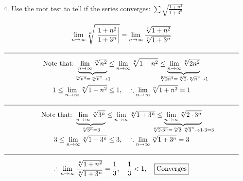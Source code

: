 \begin{itemize}
        \item [4.] Use the root test to tell if the series converges: $\sum\sqrt{\frac{1+n^{2}}{1+3^{n}}}$
        \\
        \begin{mdframed}
            \begin{equation*}
                \begin{gathered}
                    \lim_{n \to \infty}
                    \sqrt[n]
                    {\left|
                        \frac{1+n^{2}}{1+3^{n}}
                    \right|}
                    = \lim_{n \to \infty}
                    \frac{\sqrt[n]{1+n^{2}}}{\sqrt[n]{1+3^{n}}}                 \\
                    \horizontal                                                 \\
                    \text{Note that: } 
                    \underbrace{\lim_{n \to \infty}\sqrt[n]{n^{2}}}
                    _{\mathclap{\sqrt[n]{n^{2}} = \sqrt[n]{n}^{2} \to 1}} \leq
                    \lim_{n \to \infty}\sqrt[n]{1+n^{2}} \leq
                    \underbrace{\lim_{n \to \infty}\sqrt[n]{2n^{2}}}
                    _{\mathclap{\sqrt[n]{2n^{2}} = 
                    \sqrt[n]{2}\cdot\sqrt[n]{n}^{2} \to 1}}  \\
                    1 \leq \lim_{n \to \infty}\sqrt[n]{1+n^{2}} \leq 1, \quad 
                    \therefore \lim_{n \to \infty}\sqrt[n]{1+n^{2}} = 1         \\
                    \horizontal                                                 \\
                    \text{Note that: } 
                    \underbrace{\lim_{n \to \infty}\sqrt[n]{3^{n}}}
                    _{\mathclap{\sqrt[n]{3^{n}} = 3}} \leq
                    \lim_{n \to \infty}\sqrt[n]{1+3^{n}} \leq
                    \underbrace{\lim_{n \to \infty}\sqrt[n]{2\cdot3^{n}}}
                    _{\mathclap{\sqrt[n]{2\cdot3^{n}} = 
                    \sqrt[n]{2}\cdot\sqrt[n]{3}^{n} \to 1\cdot3 = 3}}           \\
                    3 \leq \lim_{n \to \infty}\sqrt[n]{1+3^{n}} \leq 3, \quad 
                    \therefore \lim_{n \to \infty}\sqrt[n]{1+3^{n}} = 3         \\
                    \horizontal                                                 \\
                    \therefore \lim_{n \to \infty}
                    \frac{\sqrt[n]{1+n^{2}}}{\sqrt[n]{1+3^{n}}} = \frac{1}{3}, \quad
                    \frac{1}{3} < 1, \quad \boxed{\text{Converges}}
                \end{gathered}
            \end{equation*}
        \end{mdframed}


\end{itemize}
